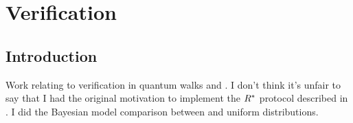 \chapter{Verification}
\label{ch:Verification}

\section{Introduction}
Work relating to verification in quantum walks and \bosonsampling. I don't think
it's unfair to say that I had the original motivation to implement the
\(R^{*}\) protocol described in \cite{aaronson13}. I did the Bayesian model
comparison between \bosonsampling and uniform distributions.
